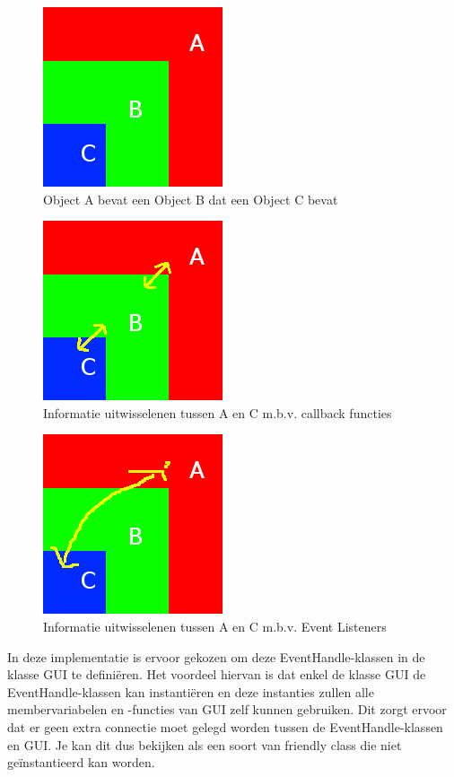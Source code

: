 \documentclass[a4paper,11pt,oneside, titlepage]{article}
\begin{document}
\begin{figure}[htbp]
\centering
\includegraphics[scale=0.4]{./screenies2/vb.png}
\caption{Object A bevat een Object B dat een Object C bevat}\label{vb}
\end{figure}
\begin{figure}[htbp]
\centering
\includegraphics[scale=0.4]{./screenies2/vbCallbacks.png}
\caption{Informatie uitwisselenen tussen A en C m.b.v. callback functies}\label{call}
\end{figure}
\begin{figure}[htbp]
\centering
\includegraphics[scale=0.4]{./screenies2/vbListeners.png}
\caption{Informatie uitwisselenen tussen A en C m.b.v. Event Listeners}\label{lis}
\end{figure}
In deze implementatie is ervoor gekozen om deze EventHandle-klassen in de klasse GUI te 
defini\"eren. Het voordeel hiervan is dat enkel de klasse GUI de EventHandle-klassen kan 
instanti\"eren en deze instanties zullen alle membervariabelen en -functies van GUI zelf kunnen 
gebruiken. Dit zorgt ervoor dat er geen extra connectie moet gelegd worden tussen de 
EventHandle-klassen en GUI. Je kan dit dus bekijken als een soort van friendly class die niet ge\"instantieerd kan worden.
\end{document}

